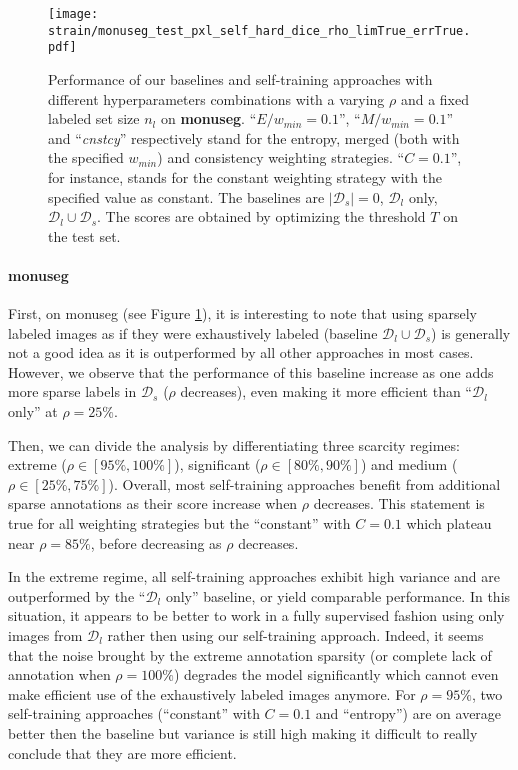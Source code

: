 \begin{figure}
  \centering
  \texttt{[image: strain/monuseg\_test\_pxl\_self\_hard\_dice\_rho\_limTrue\_errTrue.pdf]}
  \caption{Performance of our baselines and self-training approaches with different hyperparameters combinations with a varying $\rho$ and a fixed labeled set size $n_l$ on \textbf{\acrshort{monuseg}}. ``$E / w_{min} = 0.1$'', ``$M / w_{min} = 0.1$'' and ``\textit{cnstcy}'' respectively stand for the entropy, merged (both with the specified $w_{min}$) and consistency weighting strategies. ``$C = 0.1$'', for instance, stands for the constant weighting strategy with the specified value as constant. The baselines are $|\mathcal{D}_s| = 0$, $\mathcal{D}_l$ only, $\mathcal{D}_l \cup \mathcal{D}_s$. The scores are obtained by optimizing the threshold $T$ on the test set.}
  \label{fig:strain:rho_exp_monuseg}
\end{figure}

\paragraph{\acrshort{monuseg}} First, on \acrshort{monuseg} (see Figure \ref{fig:strain:rho_exp_monuseg}), it is interesting to note that using sparsely labeled images as if they were exhaustively labeled (\ie baseline $\mathcal{D}_l \cup \mathcal{D}_s$) is generally not a good idea as it is outperformed by all other approaches in most cases. However, we observe that the performance of this baseline increase as one adds more sparse labels in $\mathcal{D}_s$ (\ie $\rho$ decreases), even making it more efficient than ``$\mathcal{D}_l$ only'' at $\rho = 25\%$. 

Then, we can divide the analysis by differentiating three scarcity regimes: extreme ($\rho \in [95\%, 100\%]$), significant ($\rho \in [80\%, 90\%]$) and medium ($\rho \in [25\%, 75\%]$). Overall, most self-training approaches benefit from additional sparse annotations as their score increase when $\rho$ decreases. This statement is true for all weighting strategies but the ``constant'' with $C = 0.1$ which plateau near $\rho = 85\%$, before decreasing as $\rho$ decreases. 

In the extreme regime, all self-training approaches exhibit high variance and are outperformed by the ``$\mathcal{D}_l$ only'' baseline, or yield comparable performance. In this situation, it appears to be better to work in a fully supervised fashion using only images from $\mathcal{D}_l$ rather then using our self-training approach. Indeed, it seems that the noise brought by the extreme annotation sparsity (or complete lack of annotation when $\rho = 100\%$) degrades the model significantly which cannot even make efficient use of the exhaustively labeled images anymore. For $\rho = 95\%$, two self-training approaches (``constant'' with $C = 0.1$ and ``entropy'') are on average better then the baseline but variance is still high making it difficult to really conclude that they are more efficient. 

